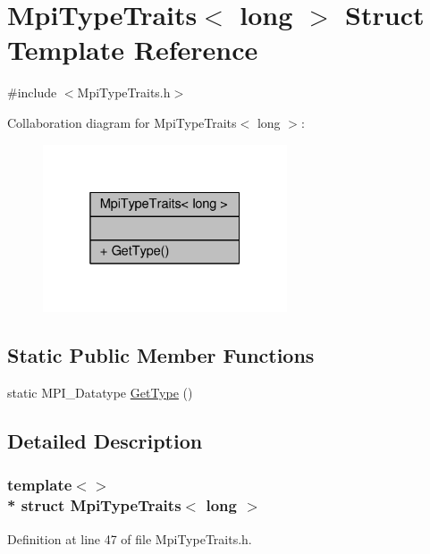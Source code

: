 \hypertarget{structMpiTypeTraits_3_01long_01_4}{}\section{Mpi\+Type\+Traits$<$ long $>$ Struct Template Reference}
\label{structMpiTypeTraits_3_01long_01_4}


{\ttfamily \#include $<$Mpi\+Type\+Traits.\+h$>$}



Collaboration diagram for Mpi\+Type\+Traits$<$ long $>$\+:\nopagebreak
\begin{figure}[H]
\begin{center}
\leavevmode
\includegraphics[width=205pt]{structMpiTypeTraits_3_01long_01_4__coll__graph}
\end{center}
\end{figure}
\subsection*{Static Public Member Functions}
\begin{DoxyCompactItemize}
\item 
static M\+P\+I\+\_\+\+Datatype \hyperlink{structMpiTypeTraits_3_01long_01_4_aa6535f0fa671eb4b101e6c205a6d7fe2}{Get\+Type} ()
\end{DoxyCompactItemize}


\subsection{Detailed Description}
\subsubsection*{template$<$$>$\\*
struct Mpi\+Type\+Traits$<$ long $>$}



Definition at line 47 of file Mpi\+Type\+Traits.\+h.



